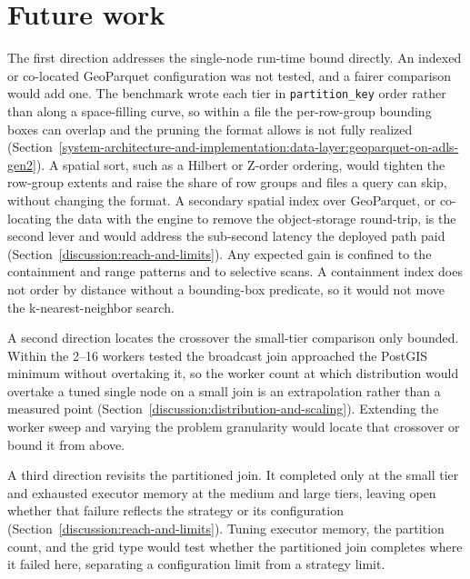 \section{Future work}
\label{discussion:future-work}

The first direction addresses the single-node run-time bound directly. An indexed or co-located GeoParquet configuration was not tested, and a fairer comparison would add one. The benchmark wrote each tier in \texttt{partition\_key} order rather than along a space-filling curve, so within a file the per-row-group bounding boxes can overlap and the pruning the format allows is not fully realized (Section~\ref{system-architecture-and-implementation:data-layer:geoparquet-on-adls-gen2}). A spatial sort, such as a Hilbert or Z-order ordering, would tighten the row-group extents and raise the share of row groups and files a query can skip, without changing the format. A secondary spatial index over GeoParquet, or co-locating the data with the engine to remove the object-storage round-trip, is the second lever and would address the sub-second latency the deployed path paid (Section~\ref{discussion:reach-and-limits}). Any expected gain is confined to the containment and range patterns and to selective scans. A containment index does not order by distance without a bounding-box predicate, so it would not move the k-nearest-neighbor search.

A second direction locates the crossover the small-tier comparison only bounded. Within the 2--16 workers tested the broadcast join approached the PostGIS minimum without overtaking it, so the worker count at which distribution would overtake a tuned single node on a small join is an extrapolation rather than a measured point (Section~\ref{discussion:distribution-and-scaling}). Extending the worker sweep and varying the problem granularity would locate that crossover or bound it from above.

A third direction revisits the partitioned join. It completed only at the small tier and exhausted executor memory at the medium and large tiers, leaving open whether that failure reflects the strategy or its configuration (Section~\ref{discussion:reach-and-limits}). Tuning executor memory, the partition count, and the grid type would test whether the partitioned join completes where it failed here, separating a configuration limit from a strategy limit.